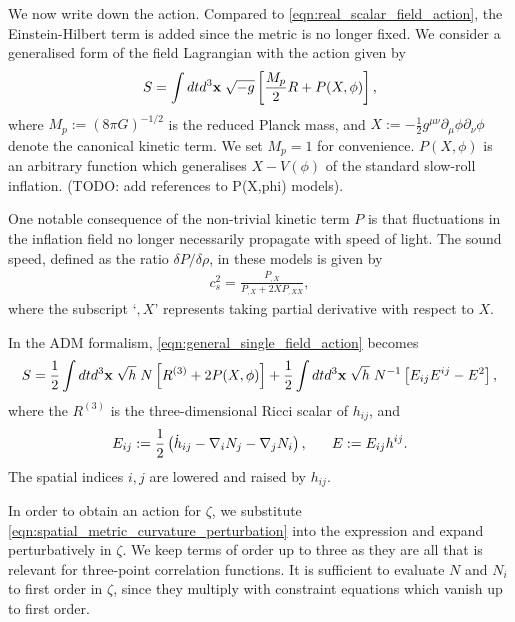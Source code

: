 We now write down the action. Compared to \eqref{eqn:real_scalar_field_action}, the Einstein-Hilbert term is added since the metric is no longer fixed. We consider a generalised form of the field Lagrangian with the action given by
\begin{align}
	S = \int dt d^3 \mathbf{x} \; \sqrt{-g} \left[ \frac{M_p}{2} R + P(X,\phi) \right],  \label{eqn:general_single_field_action}
\end{align}
where $M_p := (8\pi G)^{-1/2}$ is the reduced Planck mass, and $X:=-\frac{1}{2} g^{\mu\nu} \partial_\mu \phi \partial_\nu \phi$ denote the canonical kinetic term. We set $M_p=1$ for convenience. $P(X,\phi)$ is an arbitrary function which generalises $X-V(\phi)$ of the standard slow-roll inflation. (TODO: add references to P(X,phi) models).

One notable consequence of the non-trivial kinetic term $P$ is that fluctuations in the inflation field no longer necessarily propagate with speed of light. The sound speed, defined as the ratio $\delta P / \delta \rho$, in these models is given by
\begin{align}
	c_s^2 = \frac{P_{,X}}{P_{,X} + 2 X P_{,XX}}, \label{eqn:general_single_field_sound_speed}
\end{align}
where the subscript `$,X$' represents taking partial derivative with respect to $X$.

In the ADM formalism, \eqref{eqn:general_single_field_action} becomes
\begin{align}
	S = \frac{1}{2}\int dt d^3 \mathbf{x} \; \sqrt{h} \; N \left[ R^{(3)} + 2P(X,\phi) \right] + \frac{1}{2} \int dt d^3 \mathbf{x} \; \sqrt{h} \; N^{-1} \left[ E_{ij} E^{ij} - E^2 \right],
\end{align}
where the $R^{(3)}$ is the three-dimensional Ricci scalar of $h_{ij}$, and
\begin{align}
	E_{ij} := \frac{1}{2} \left( \dot{h}_{ij} - \nabla_i N_j - \nabla_j N_i \right), \hspace{0.05\textwidth}
	E := E_{ij} h^{ij}.
\end{align}
The spatial indices $i,j$ are lowered and raised by $h_{ij}$.

In order to obtain an action for $\zeta$, we substitute \eqref{eqn:spatial_metric_curvature_perturbation} into the expression and expand perturbatively in $\zeta$. We keep terms of order up to three as they are all that is relevant for three-point correlation functions. It is sufficient to evaluate $N$ and $N_i$ to first order in $\zeta$, since they multiply with constraint equations which vanish up to first order.

